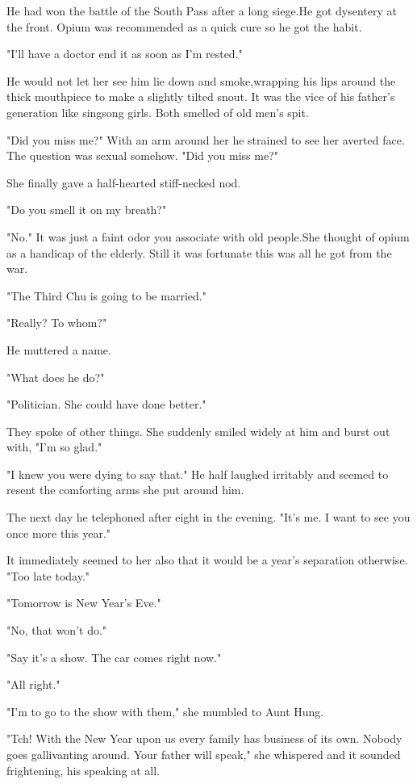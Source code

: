 \par He had won the battle of the South Pass after a long siege.He got dysentery at the front. Opium was recommended as a quick cure so he got the habit.
\par "I'll have a doctor end it as soon as I'm rested."
\par He would not let her see him lie down and smoke,wrapping his lips around the thick mouthpiece to make a slightly tilted snout. It was the vice of his father's generation like singsong girls. Both smelled of old men's spit.
\par "Did you miss me?" With an arm around her he strained to see her averted face. The question was sexual somehow. "Did you miss me?"
\par She finally gave a half-hearted stiff-necked nod.
\par "Do you smell it on my breath?"
\par "No." It was just a faint odor you associate with old people.She thought of opium as a handicap of the elderly. Still it was fortunate this was all he got from the war.
\par "The Third Chu is going to be married."
\par "Really? To whom?"
\par He muttered a name.
\par "What does he do?"
\par "Politician. She could have done better."
\par They spoke of other things. She suddenly smiled widely at him and burst out with, "I'm so glad."
\par "I knew you were dying to say that." He half laughed irritably and seemed to resent the comforting arms she put around him.
\par The next day he telephoned after eight in the evening. "It's me. I want to see you once more this year."
\par It immediately seemed to her also that it would be a year's separation otherwise. "Too late today."
\par "Tomorrow is New Year's Eve."
\par "No, that won't do."
\par "Say it's a show. The car comes right now."
\par "All right."
\par "I'm to go to the show with them," she mumbled to Aunt Hung.
\par "Tch! With the New Year upon us every family has business of its own. Nobody goes gallivanting around. Your father will speak," she whispered and it sounded frightening, his speaking at all.
